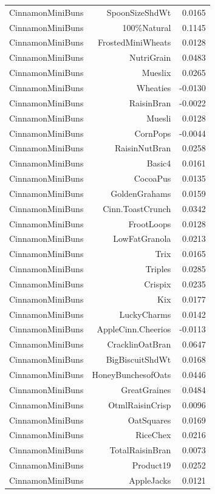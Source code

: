 \begin{longtable}{@{}lrr@{}}
CinnamonMiniBuns & SpoonSizeShdWt & 0.0165 \\
CinnamonMiniBuns & 100\%Natural & 0.1145 \\
CinnamonMiniBuns & FrostedMiniWheats & 0.0128 \\
CinnamonMiniBuns & NutriGrain & 0.0483 \\
CinnamonMiniBuns & Mueslix & 0.0265 \\
CinnamonMiniBuns & Wheaties & -0.0130 \\
CinnamonMiniBuns & RaisinBran & -0.0022 \\
CinnamonMiniBuns & Muesli & 0.0128 \\
CinnamonMiniBuns & CornPops & -0.0044 \\
CinnamonMiniBuns & RaisinNutBran & 0.0258 \\
CinnamonMiniBuns & Basic4 & 0.0161 \\
CinnamonMiniBuns & CocoaPus & 0.0135 \\
CinnamonMiniBuns & GoldenGrahams & 0.0159 \\
CinnamonMiniBuns & Cinn.ToastCrunch & 0.0342 \\
CinnamonMiniBuns & FrootLoops & 0.0128 \\
CinnamonMiniBuns & LowFatGranola & 0.0213 \\
CinnamonMiniBuns & Trix & 0.0165 \\
CinnamonMiniBuns & Triples & 0.0285 \\
CinnamonMiniBuns & Crispix & 0.0235 \\
CinnamonMiniBuns & Kix & 0.0177 \\
CinnamonMiniBuns & LuckyCharms & 0.0142 \\
CinnamonMiniBuns & AppleCinn.Cheerios & -0.0113 \\
CinnamonMiniBuns & CracklinOatBran & 0.0647 \\
CinnamonMiniBuns & BigBiscuitShdWt & 0.0168 \\
CinnamonMiniBuns & HoneyBunchesofOats & 0.0446 \\
CinnamonMiniBuns & GreatGraines & 0.0484 \\
CinnamonMiniBuns & OtmlRaisinCrisp & 0.0096 \\
CinnamonMiniBuns & OatSquares & 0.0169 \\
CinnamonMiniBuns & RiceChex & 0.0216 \\
CinnamonMiniBuns & TotalRaisinBran & 0.0073 \\
CinnamonMiniBuns & Product19 & 0.0252 \\
CinnamonMiniBuns & AppleJacks & 0.0121 \\

\end{longtable}
